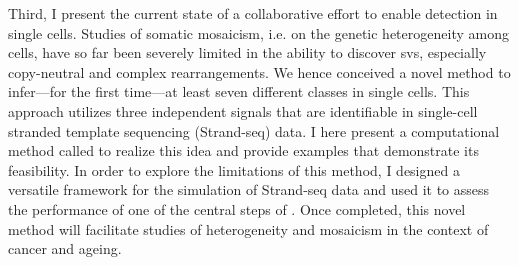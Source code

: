 
Third, I present the current state of a collaborative effort
to enable \sv detection in single cells. Studies of somatic mosaicism, i.e. on
the genetic heterogeneity among cells, have so far been severely limited in the
ability to discover \acp{sv}, especially copy-neutral and complex rearrangements.
We hence conceived a novel method to infer---for the first time---at least seven
different \sv classes in single cells. This approach utilizes three independent
signals that are identifiable in single-cell stranded template sequencing
(Strand-seq) data. I here
present a computational method called \mc to realize this idea and provide
examples that demonstrate its feasibility. In order to explore the limitations
of this method, I designed a versatile framework for the simulation of
Strand-seq data and used it to assess the performance of one of the central
steps of \mc. Once completed, this novel method will facilitate studies of \sv
heterogeneity and mosaicism in the context of cancer and ageing.


